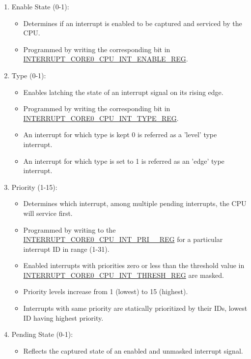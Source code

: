 \documentclass[main\_\_EN.tex]{subfiles}
\begin{document}
\begin{enumerate}
    \item Enable State (0-1):
    \begin{itemize}
        \item Determines if an interrupt is enabled to be captured and serviced by the CPU.
        \item Programmed by writing the corresponding bit in \hyperref[regdesc:INTERRUPTCORE0CPUINTENABLEREG]{INTERRUPT\_CORE0\_CPU\_INT\_ENABLE\_REG}.
    \end{itemize}
    \item Type (0-1):
    \begin{itemize}
        \item Enables latching the state of an interrupt signal on its rising edge.
        \item Programmed by writing the corresponding bit in \hyperref[regdesc:INTERRUPTCORE0CPUINTTYPEREG]{INTERRUPT\_CORE0\_CPU\_INT\_TYPE\_REG}.
        \item An interrupt for which type is kept 0 is referred as a 'level' type interrupt.
        \item An interrupt for which type is set to 1 is referred as an 'edge' type interrupt.
    \end{itemize}
    \item Priority (1-15):
    \begin{itemize}
        \item Determines which interrupt, among multiple pending interrupts, the CPU will service first.
        \item Programmed by writing to the \hyperref[regdesc:INTERRUPTCORE0CPUINTPRI0REG]{INTERRUPT\_CORE0\_CPU\_INT\_PRI\_\_REG} for a particular interrupt ID  in range (1-31).
        \item Enabled interrupts with priorities zero or less than the threshold value in \hyperref[regdesc:INTERRUPTCORE0CPUINTTHRESHREG]{INTERRUPT\_CORE0\_CPU\_INT\_THRESH\_REG} are masked.
        \item Priority levels increase from 1 (lowest) to 15 (highest).
        \item Interrupts with same priority are statically prioritized by their IDs, lowest ID having highest priority.
    \end{itemize}
    \item Pending State (0-1):
    \begin{itemize}
        \item Reflects the captured state of an enabled and unmasked interrupt signal.

\end{itemize}
\end{enumerate}
\end{document}
